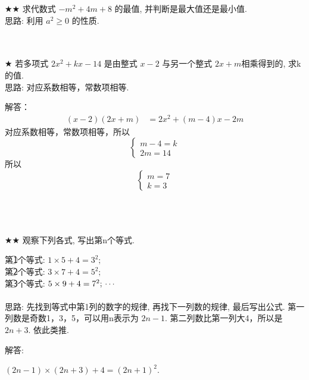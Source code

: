\item {
    $\bigstar\bigstar$
    求代数式 $-m^2 + 4m + 8$ 的最值, 并判断是最大值还是最小值. 
    \ifshowSolution
        \fangsong{}
        \\
        思路: 利用 $a^2 \geq 0$ 的性质. 
    \else
        \\ \\ \\
    \fi
}


\item {
    $\bigstar$
    若多项式 $2x^2 + kx - 14$ 是由整式 $x-2$ 与另一个整式 $2x+m$相乘得到的, 求k的值. 
    \ifshowSolution
        \fangsong{}
        \\
        思路: 对应系数相等，常数项相等. 

        解答：
        \begin{align*}
            (x-2)(2x+m) &= 2x^2 + (m-4)x - 2m
        \end{align*}
        对应系数相等，常数项相等，所以
        \[\left\{ 
            \begin{array}{lc}
                m-4 = k \\
                2m = 14
            \end{array}
        \right. \]
        所以
        \[\left\{ 
            \begin{array}{lc}
                m = 7 \\
                k = 3
            \end{array}
        \right. \]
    \else
        \\ \\ \\
    \fi
}

\item {
    $\bigstar \bigstar$
    观察下列各式, 写出第n个等式. 

    第\textcircled{1}个等式: $1\times 5 + 4 = 3^2;$ \\
    第\textcircled{2}个等式: $3\times 7 + 4 = 5^2;$ \\
    第\textcircled{3}个等式: $5\times 9 + 4 = 7^2; \\ \cdots $ \\
    \ifshowSolution
        \fangsong{}
        \\
        思路: 先找到等式中第1列的数字的规律, 再找下一列数的规律, 最后写出公式. 第一列数是奇数1，3，5，可以用n表示为 $2n-1$. 第二列数比第一列大4，所以是$2n+3$. 依此类推. 

        解答: 

        $(2n-1)\times (2n+3) + 4 = (2n+1)^2$. 
    \else
        \\ \\ \\
    \fi
}

